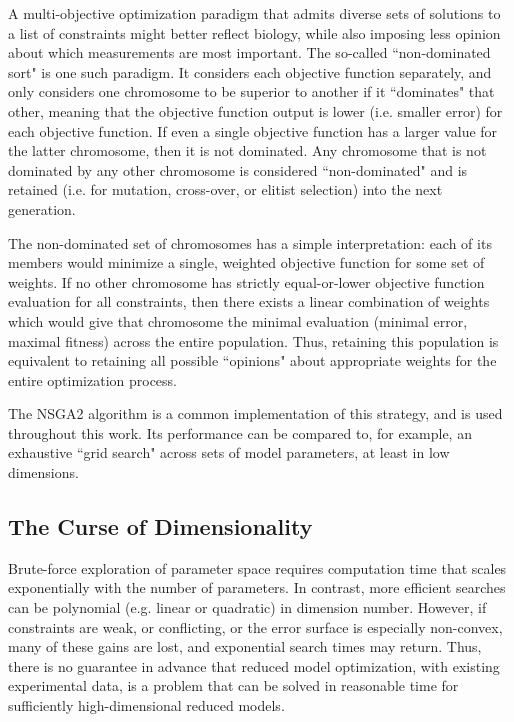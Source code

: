 A multi-objective optimization paradigm that admits diverse sets of solutions to a list of constraints might better reflect biology, while also imposing less opinion about which measurements are most important.
The so-called ``non-dominated sort" is one such paradigm.
It considers each objective function separately, and only considers one chromosome to be superior to another if it ``dominates" that other, meaning that the objective function output is lower (i.e. smaller error) for each objective function.
If even a single objective function has a larger value for the latter chromosome, then it is not dominated.  Any chromosome that is not dominated by any other chromosome is considered ``non-dominated" and is retained (i.e. for mutation, cross-over, or elitist selection) into the next generation.

The non-dominated set of chromosomes has a simple interpretation: each of its members would minimize a single, weighted objective function for some set of weights.
If no other chromosome has strictly equal-or-lower objective function evaluation for all constraints, then there exists a linear combination of weights which would give that chromosome the minimal evaluation (minimal error, maximal fitness) across the entire population.
Thus, retaining this population is equivalent to retaining all possible ``opinions" about appropriate weights for the entire optimization process.

The NSGA2 algorithm \citep{deb2000fast} is a common implementation of this strategy, and is used throughout this work. Its performance can be compared to, for example, an exhaustive ``grid search" across sets of model parameters, at least in low dimensions.  

\subsection{The Curse of Dimensionality}
Brute-force exploration of parameter space requires computation time that scales exponentially with the number of parameters.  In contrast, more efficient searches can be polynomial (e.g. linear or quadratic) in dimension number.  However, if constraints are weak, or conflicting, or the error surface is especially non-convex, many of these gains are lost, and exponential search times may return.  Thus, there is no guarantee in advance that reduced model optimization, with existing experimental data, is a problem that can be solved in reasonable time for sufficiently high-dimensional reduced models.

